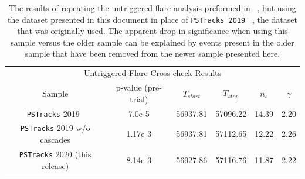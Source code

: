 \documentclass[aps,10pt,prd,twocolumn,floats,letterpaper,showpacs,nofootinbib,bibnotes,notitlepage,superscriptaddress,floatfix]{revtex4-1}
\begin{document}
\begin{table}[p]
\centering
\begin{ruledtabular}
\begin{tabular}{cccccc}
\multicolumn{6}{c}{Untriggered Flare Cross-check Results} \\[0.1cm]
Sample & p-value (pre-trial) & $T_{start}$ & $T_{stop}$ & $n_s$ & $\gamma$ \\ 
{\tt PSTracks} 2019~\cite{IceCube:2018cha,IceCube:2019} & 7.0e-5 & 56937.81 & 57096.22 & 14.39 & 2.20  \\
{\tt PSTracks} 2019 w/o cascades & 1.17e-3 & 56937.81 & 57112.65 & 12.22 & 2.26 \\
{\tt PSTracks} 2020 (this release) & 8.14e-3 & 56927.86 & 57116.76 & 11.87 & 2.22\\
\end{tabular}
\end{ruledtabular}
\caption[]{The results of repeating the untriggered flare analysis preformed in ~\cite{IceCube:2018cha}, but using the dataset presented in this document in place of {\tt PSTracks 2019} ~\cite{IceCube:2019}, the dataset that was originally used. The apparent drop in significance when using this sample versus the older sample can be explained by events present in the older sample that have been removed from the newer sample presented here.}\label{tab:TXSCrossChecks}
\end{table}
\end{document}
